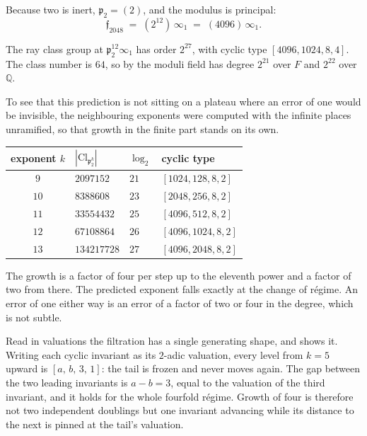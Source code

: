 \documentclass[12pt,a4paper]{article}
\newcommand{\Fd}{F}
\newcommand{\pt}{\mathfrak{p}_2}
\newcommand{\Cl}{\mathrm{Cl}}
\begin{document}
Because two is inert, $\pt = (2)$, and the modulus is principal:
\begin{equation}\label{eq:modulus}
  \mathfrak{f}_{2048} \;=\; (2^{12})\,\infty_1 \;=\; (4096)\,\infty_1 .
\end{equation}

The ray class group at $\pt^{12}\infty_1$ has order $2^{27}$, with cyclic type
$[4096,1024,8,4]$. The class number is $64$, so by  the
moduli field has degree $2^{21}$ over $\Fd$ and $2^{22}$ over $\mathbb{Q}$.

To see that this prediction is not sitting on a plateau where an error of one
would be invisible, the neighbouring exponents were computed with the infinite
places unramified, so that growth in the finite part stands on its own.

\begin{center}
\begin{tabular}{@{}clll@{}}
\toprule
exponent $k$ & $|\Cl_{\pt^k}|$ & $\log_2$ & cyclic type \\
\midrule
$9$  & $2097152$   & $21$ & $[1024, 128, 8, 2]$ \\
$10$ & $8388608$   & $23$ & $[2048, 256, 8, 2]$ \\
$11$ & $33554432$  & $25$ & $[4096, 512, 8, 2]$ \\
$12$ & $67108864$  & $26$ & $[4096, 1024, 8, 2]$ \\
$13$ & $134217728$ & $27$ & $[4096, 2048, 8, 2]$ \\
\bottomrule
\end{tabular}
\end{center}

The growth is a factor of four per step up to the eleventh power and a factor of
two from there. The predicted exponent falls exactly at the change of régime. An
error of one either way is an error of a factor of two or four in the degree,
which is not subtle.

Read in valuations the filtration has a single generating shape, and
 shows it. Writing each cyclic invariant as its $2$-adic
valuation, every level from $k=5$ upward is $[a,\,b,\,3,\,1]$: the tail is frozen
and never moves again. The gap between the two leading invariants is $a-b=3$,
equal to the valuation of the third invariant, and it holds for the whole
fourfold r\'egime. Growth of four is therefore not two independent doublings but
one invariant advancing while its distance to the next is pinned at the tail's
valuation.
\end{document}
